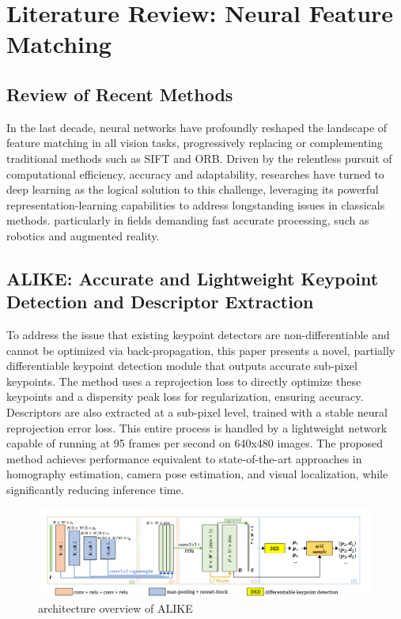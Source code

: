 \chapter{Literature Review: Neural Feature Matching}
\section{Review of Recent Methods}
In the last decade, neural networks have profoundly reshaped the landscape of
feature matching in all vision tasks, progressively replacing or complementing
traditional methods such as SIFT and ORB. Driven by the relentless pursuit of
computational efficiency, accuracy and adaptability, researches have turned to
deep learning as the logical solution to this challenge, leveraging its
powerful representation-learning capabilities to address longstanding issues in
classicals methods. particularly in fields demanding fast accurate processing,
such as robotics and augmented reality.

\section{ALIKE: Accurate and Lightweight Keypoint Detection and Descriptor Extraction}
To address the issue that existing keypoint detectors are non-differentiable
and cannot be optimized via back-propagation, this paper presents a novel,
partially differentiable keypoint detection module that outputs accurate
sub-pixel keypoints. The method uses a reprojection loss to directly optimize
these keypoints and a dispersity peak loss for regularization, ensuring
accuracy. Descriptors are also extracted at a sub-pixel level, trained with a
stable neural reprojection error loss. This entire process is handled by a
lightweight network capable of running at 95 frames per second on 640x480
images. The proposed method achieves performance equivalent to state-of-the-art
approaches in homography estimation, camera pose estimation, and visual
localization, while significantly reducing inference time.
\begin{figure}[h]
    \centering
    \includegraphics[width=\textwidth]{ressources/alike.png}
    \caption{architecture overview of ALIKE}
    \label{fig:alike}
\end{figure}
